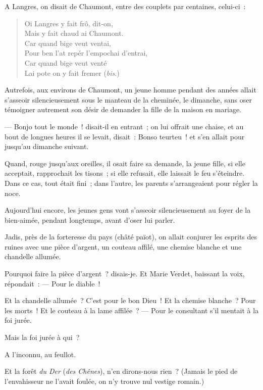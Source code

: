 \documentclass[french,twoside]{book} %
\begin{document}
\noindent A Langres, on disait de Chaumont, entre des couplets par centaines, celui-ci :\par


\begin{verse}
Oi Langres y fait frô, dit-on,\\
Mais y fait chaud ai Chaumont.\\
Car quand bige veut ventai,\\
Pour ben l’at repér l’empochai d’entrai,\\
Car quand bige veut venté\\
Lai pote on y fait fremer (\emph{bis}.)\\
\end{verse}

\noindent Autrefois, aux environs de Chaumont, un jeune  homme pendant des années allait s’asseoir silencieusement sous le manteau de la cheminée, le dimanche, sans oser témoigner autrement son désir de demander la fille de la maison en mariage.\par
— Bonjo tout le monde ! disait-il en entrant ; on lui offrait une chaise, et au bout de longues heures il se levait, disait : Bonso teurteu ! et s’en allait pour jusqu’au dimanche suivant.\par
Quand, rouge jusqu’aux oreilles, il osait faire sa demande, la jeune fille, si elle acceptait, rapprochait les tisons ; si elle refusait, elle laissait le feu s’éteindre. Dans ce cas, tout était fini ; dans l’autre, les parents s’arrangeaient pour régler la noce.\par
Aujourd’hui encore, les jeunes gens vont s’asseoir silencieusement au foyer de la bien-aimée, pendant longtemps, avant d’oser lui parler.\par
Jadis, près de la forteresse du pays (châté païot), on allait conjurer les esprits des ruines avec une pièce d’argent, un couteau affilé, une chemise blanche et une chandelle allumée.\par
Pourquoi faire la pièce d’argent ? disais-je. Et Marie Verdet, baissant la voix, répondait : — Pour le diable !\par
Et la chandelle allumée ? C’est pour le bon Dieu ! Et la chemise blanche ? Pour les morts !  Et le couteau à la lame affilée ? — Pour le consultant s’il mentait à la foi jurée.\par
Mais la foi jurée à qui ?\par
A l’inconnu, au feullot.\par
Et la forêt \emph{du Der} (\emph{des Chênes}), n’en dirons-nous rien ? (Jamais le pied de l’envahisseur ne l’avait foulée, on n’y trouve nul vestige romain.)\par
\end{document}

